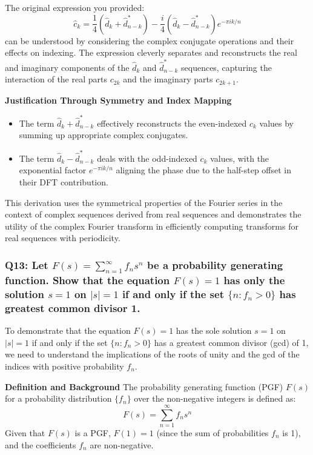 \documentclass[8pt]{article}
\begin{document}
{The original expression you provided:
\[
\hat{c}_k = \frac{1}{4} \left( \hat{d}_k + \hat{d}^*_{n-k} \right) - \frac{i}{4} \left( \hat{d}_k - \hat{d}^*_{n-k} \right) e^{-\pi i k / n}
\]
can be understood by considering the complex conjugate operations and their effects on indexing. The expression cleverly separates and reconstructs the real and imaginary components of the \(\hat{d}_k\) and \(\hat{d}^*_{n-k}\) sequences, capturing the interaction of the real parts \(c_{2k}\) and the imaginary parts \(c_{2k+1}\).

\textbf{Justification Through Symmetry and Index Mapping}
\begin{itemize}
    \item The term \(\hat{d}_k + \hat{d}^*_{n-k}\) effectively reconstructs the even-indexed \(c_k\) values by summing up appropriate complex conjugates.
    \item The term \(\hat{d}_k - \hat{d}^*_{n-k}\) deals with the odd-indexed \(c_k\) values, with the exponential factor \(e^{-\pi i k / n}\) aligning the phase due to the half-step offset in their DFT contribution.
\end{itemize}

This derivation uses the symmetrical properties of the Fourier series in the context of complex sequences derived from real sequences and demonstrates the utility of the complex Fourier transform in efficiently computing transforms for real sequences with periodicity.

\subsubsection*{Q13:
Let \(F(s) = \sum_{n=1}^{\infty} f_n s^n\) be a probability generating function. Show that the equation \(F(s) = 1\) has only the solution \(s = 1\) on \(|s| = 1\) if and only if the set \(\{ n : f_n > 0 \}\) has greatest common divisor 1.}

To demonstrate that the equation \( F(s) = 1 \) has the sole solution \( s = 1 \) on \( |s| = 1 \) if and only if the set \( \{ n : f_n > 0 \} \) has a greatest common divisor (gcd) of 1, we need to understand the implications of the roots of unity and the gcd of the indices with positive probability \( f_n \).

\textbf{Definition and Background}
The probability generating function (PGF) \( F(s) \) for a probability distribution \( \{f_n\} \) over the non-negative integers is defined as:
\[
F(s) = \sum_{n=1}^{\infty} f_n s^n
\]
Given that \( F(s) \) is a PGF, \( F(1) = 1 \) (since the sum of probabilities \( f_n \) is 1), and the coefficients \( f_n \) are non-negative.

}
\end{document}
